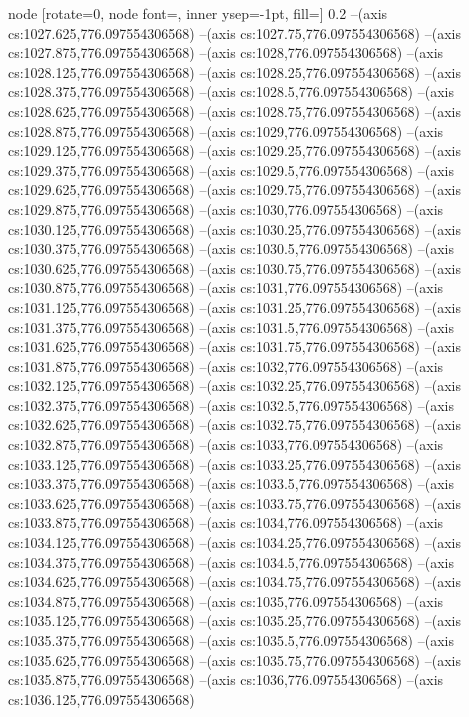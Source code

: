 node [rotate=0, node font=\tiny, inner ysep=-1pt, fill=\bgcol] {0.2}
--(axis cs:1027.625,776.097554306568)
--(axis cs:1027.75,776.097554306568)
--(axis cs:1027.875,776.097554306568)
--(axis cs:1028,776.097554306568)
--(axis cs:1028.125,776.097554306568)
--(axis cs:1028.25,776.097554306568)
--(axis cs:1028.375,776.097554306568)
--(axis cs:1028.5,776.097554306568)
--(axis cs:1028.625,776.097554306568)
--(axis cs:1028.75,776.097554306568)
--(axis cs:1028.875,776.097554306568)
--(axis cs:1029,776.097554306568)
--(axis cs:1029.125,776.097554306568)
--(axis cs:1029.25,776.097554306568)
--(axis cs:1029.375,776.097554306568)
--(axis cs:1029.5,776.097554306568)
--(axis cs:1029.625,776.097554306568)
--(axis cs:1029.75,776.097554306568)
--(axis cs:1029.875,776.097554306568)
--(axis cs:1030,776.097554306568)
--(axis cs:1030.125,776.097554306568)
--(axis cs:1030.25,776.097554306568)
--(axis cs:1030.375,776.097554306568)
--(axis cs:1030.5,776.097554306568)
--(axis cs:1030.625,776.097554306568)
--(axis cs:1030.75,776.097554306568)
--(axis cs:1030.875,776.097554306568)
--(axis cs:1031,776.097554306568)
--(axis cs:1031.125,776.097554306568)
--(axis cs:1031.25,776.097554306568)
--(axis cs:1031.375,776.097554306568)
--(axis cs:1031.5,776.097554306568)
--(axis cs:1031.625,776.097554306568)
--(axis cs:1031.75,776.097554306568)
--(axis cs:1031.875,776.097554306568)
--(axis cs:1032,776.097554306568)
--(axis cs:1032.125,776.097554306568)
--(axis cs:1032.25,776.097554306568)
--(axis cs:1032.375,776.097554306568)
--(axis cs:1032.5,776.097554306568)
--(axis cs:1032.625,776.097554306568)
--(axis cs:1032.75,776.097554306568)
--(axis cs:1032.875,776.097554306568)
--(axis cs:1033,776.097554306568)
--(axis cs:1033.125,776.097554306568)
--(axis cs:1033.25,776.097554306568)
--(axis cs:1033.375,776.097554306568)
--(axis cs:1033.5,776.097554306568)
--(axis cs:1033.625,776.097554306568)
--(axis cs:1033.75,776.097554306568)
--(axis cs:1033.875,776.097554306568)
--(axis cs:1034,776.097554306568)
--(axis cs:1034.125,776.097554306568)
--(axis cs:1034.25,776.097554306568)
--(axis cs:1034.375,776.097554306568)
--(axis cs:1034.5,776.097554306568)
--(axis cs:1034.625,776.097554306568)
--(axis cs:1034.75,776.097554306568)
--(axis cs:1034.875,776.097554306568)
--(axis cs:1035,776.097554306568)
--(axis cs:1035.125,776.097554306568)
--(axis cs:1035.25,776.097554306568)
--(axis cs:1035.375,776.097554306568)
--(axis cs:1035.5,776.097554306568)
--(axis cs:1035.625,776.097554306568)
--(axis cs:1035.75,776.097554306568)
--(axis cs:1035.875,776.097554306568)
--(axis cs:1036,776.097554306568)
--(axis cs:1036.125,776.097554306568)
